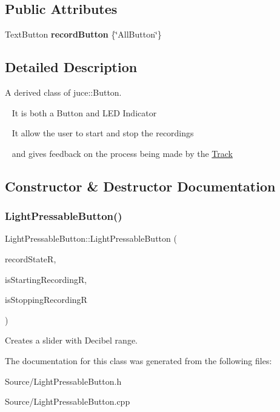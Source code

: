 \subsection*{Public Attributes}
\begin{DoxyCompactItemize}
\item 
\mbox{\label{class_light_pressable_button_aa9848497589960fa7d14cda183c3d554}} 
Text\+Button {\bfseries record\+Button} \{\char`\"{}All\+Button\char`\"{}\}
\end{DoxyCompactItemize}


\subsection{Detailed Description}
A derived class of juce\+::\+Button.

~\newline
 It is both a Button and L\+ED Indicator

~\newline
 It allow the user to start and stop the recordings

~\newline
 and gives feedback on the process being made by the \mbox{\hyperlink{class_track}{Track}} 

\subsection{Constructor \& Destructor Documentation}
\mbox{\label{class_light_pressable_button_a6a87109cc5937942c7dc9d7f468a81a9}} 
\subsubsection{\texorpdfstring{LightPressableButton()}{LightPressableButton()}}
{\footnotesize\ttfamily Light\+Pressable\+Button\+::\+Light\+Pressable\+Button (\begin{DoxyParamCaption}\item[{Record\+State \&}]{record\+StateR,  }\item[{bool \&}]{is\+Starting\+RecordingR,  }\item[{bool \&}]{is\+Stopping\+RecordingR }\end{DoxyParamCaption})}

Creates a slider with Decibel range. 

The documentation for this class was generated from the following files\+:\begin{DoxyCompactItemize}
\item 
Source/Light\+Pressable\+Button.\+h\item 
Source/Light\+Pressable\+Button.\+cpp\end{DoxyCompactItemize}
